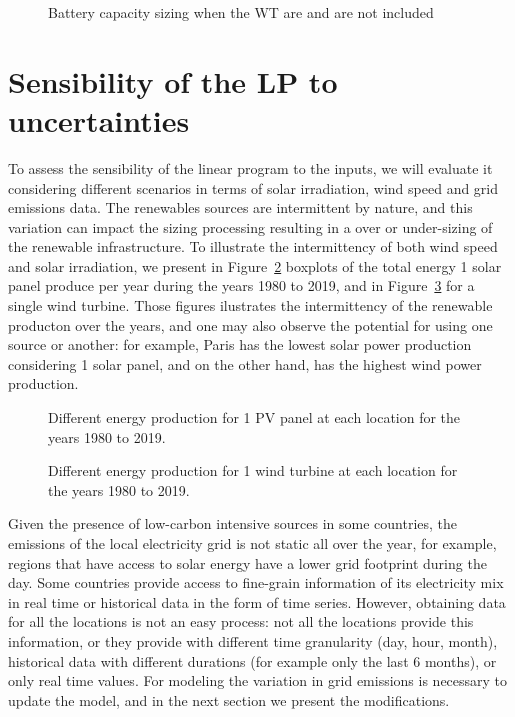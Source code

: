 \begin{figure}[H]
  \centering
  {}
  \caption{Battery capacity sizing when the WT are and are not included }
  \label{fig:wind_bat}
\end{figure}


\section{Sensibility of the LP to  uncertainties}
\label{sec:sensitivity}
To assess the sensibility of the linear program to the inputs, we will evaluate it considering different scenarios in terms of solar irradiation, wind speed and grid emissions data. The renewables sources are intermittent by nature, and this variation can impact the sizing processing resulting in a over or under-sizing of the renewable infrastructure. To illustrate the intermittency of both wind speed and solar irradiation, we present in Figure~\ref{fig:pv_boxplots} boxplots of the total energy 1 solar panel produce per year during the years 1980 to 2019, and in Figure~\ref{fig:wt_boxplots} for a single wind turbine. Those figures ilustrates the intermittency of the renewable producton over the years, and one may also observe the potential for using one source or another: for example, Paris has the lowest solar power production considering 1 solar panel, and on the other hand, has the highest wind power production. 


\begin{figure}[h]
  \centering
  {}
  \caption{Different energy production for 1 PV panel at each location for the years 1980 to 2019.}
  \label{fig:pv_boxplots}
\end{figure}


\begin{figure}[h]
  \centering
  {}
  \caption{Different energy production for 1 wind turbine at each location for the years 1980 to 2019.}
  \label{fig:wt_boxplots}
\end{figure}



Given the presence of low-carbon intensive sources in some countries, the emissions of the local electricity grid is not static all over the year, for example, regions that have access to solar energy have a lower grid footprint during the day. Some countries provide access to fine-grain information of its electricity mix in real time or historical data in the form of time series. However, obtaining data for all the locations is not an easy process: not all the locations provide this information, or they provide with different time granularity (day, hour, month), historical data with different durations (for example only the last 6 months), or only real time values. For modeling the variation in grid emissions is necessary to update the model, and in the next section we present the modifications.


